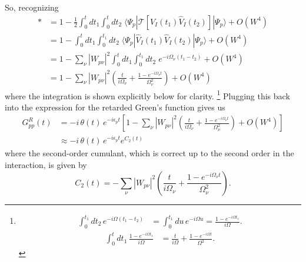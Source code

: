So, recognizing 
\begin{align}
* &=
1-\frac{1}{2}\int_0^t dt_1\int_0^{t} dt_2\;
\langle \Psi_p|\mathcal{T}\left[\hat{V}_I(t_1)\hat{V}_I(t_2)\right]|\Psi_p\rangle + O(W^4)
\\
&=
1-\int_0^t dt_1\int_0^{t_1} dt_2\;
\langle \Psi_p|\hat{V}_I(t_1)\hat{V}_I(t_2)|\Psi_p\rangle + O(W^4) \\
&=
1-\sum_\nu |W_{p\nu}|^2
\int_0^t dt_1\int_0^{t_1} dt_2\;e^{-i\Omega_\nu (t_1-t_2)} + O(W^4)\\
&=
1-\sum_\nu |W_{p\nu}|^2\left(\frac{t}{i\Omega_\nu}+\frac{1-e^{-i\Omega_\nu t}}{\Omega_\nu^2}\right) + O(W^4)
\end{align} 
where the integration is shown explicitly below for clarity.
\footnote{
\begin{align}
\int_0^{t_1} dt_2\,e^{-i\Omega (t_1-t_2)}
&=
\int_0^{t_1} du\,e^{-i\Omega u}
=
\frac{1-e^{-i\Omega t_1}}{i\Omega}.
\end{align}
\begin{align}
\int_0^{t} dt_1\,\frac{1-e^{-i\Omega t_1}}{i\Omega}
&=
\frac{t}{i\Omega} + \frac{1-e^{-i\Omega t}}{\Omega^2}.
\end{align}}
Plugging this back into the expression for the retarded Green's function gives us
\begin{align}
G_{pp}^R(t)
&=
-i\,\theta(t)\,e^{-i\epsilon_p t} \left[1-\sum_\nu |W_{p\nu}|^2\left(\frac{t}{i\Omega_\nu}+\frac{1-e^{-i\Omega_\nu t}}{\Omega_\nu^2}\right) + O(W^4)\right]\\
&\approx
-i\,\theta(t)\,e^{-i\epsilon_p t} e^{C_2(t)} 
\end{align}
where the second-order cumulant, which is correct up to the second order in the interaction, is given by
\begin{equation}
C_2(t) = -\sum_\nu |W_{p\nu}|^2\left(\frac{t}{i\Omega_\nu}+\frac{1-e^{-i\Omega_\nu t}}{\Omega_\nu^2}\right).
\end{equation} 

